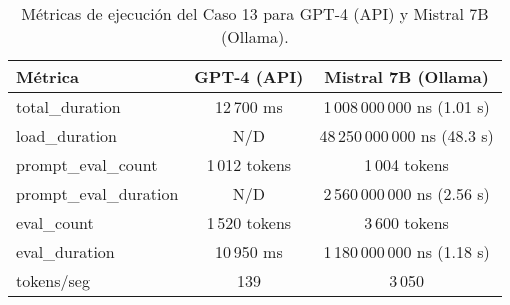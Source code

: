 
\begin{table}[h!]
\centering
\begin{tabular}{|l|c|c|}
\hline
\textbf{Métrica} & \textbf{GPT-4 (API)} & \textbf{Mistral 7B (Ollama)} \\
\hline
total\_duration & 12\,700 ms & 1\,008\,000\,000 ns (1.01 s) \\
load\_duration & N/D & 48\,250\,000\,000 ns (48.3 s) \\
prompt\_eval\_count & 1\,012 tokens & 1\,004 tokens \\
prompt\_eval\_duration & N/D & 2\,560\,000\,000 ns (2.56 s) \\
eval\_count & 1\,520 tokens & 3\,600 tokens \\
eval\_duration & 10\,950 ms & 1\,180\,000\,000 ns (1.18 s) \\
tokens/seg & 139 & 3\,050 \\
\hline
\end{tabular}
\caption{Métricas de ejecución del Caso 13 para GPT-4 (API) y Mistral 7B (Ollama).}
\end{table}
